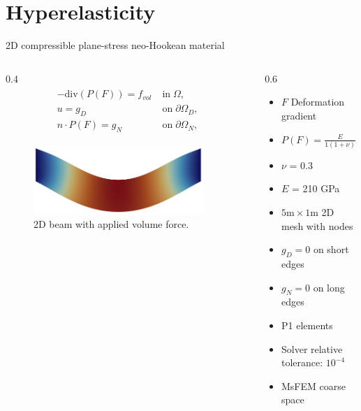 \section{Hyperelasticity}
\begin{frame}{2D compressible plane-stress neo-Hookean material}
	\vspace{0mm}
	\begin{columns}
		\begin{column}{0.4\textwidth}%
			\begin{align*}
				\label{eq:nonlinelas}
				\begin{split}
					-\mathrm{div}(P(F)) = f_{vol}\; & \mathrm{in}\;\Omega,           \\
					u = g_D \;                      & \mathrm{on}\;\partial\Omega_D, \\
					n\cdot P(F) = g_N\;             & \mathrm{on}\;\partial\Omega_N,
				\end{split}
			\end{align*}
			\begin{figure}
				\centering
				\includegraphics[width=0.9\textwidth]{images/beam2D.png}
				\caption{2D beam with applied volume force.}
				\label{fig:beam2d}
			\end{figure}
		\end{column}%
		\begin{column}{0.6\textwidth}
			\vspace{-1em}
			\centering
			\begin{itemize}
				\item $F$ Deformation gradient
				\item $P(F) = \frac{E}{1(1+\nu)}(F-F^{-T}) + \frac{E\nu}{(1+\nu)(1-2\nu)}\mathrm{ln}(\mathrm{det}(F)F^{-T})$
				\item $\nu$ = 0.3
				\item $E$ = 210 GPa
				\item $5\textrm{m}\times 1\textrm{m}$ 2D mesh with  nodes
        \item $g_D = 0$ on short edges
				\item $g_N = 0$ on long edges
				\item P1 elements
        \item Solver relative tolerance: $10^{-4}$
        \item MsFEM coarse space \footnotemark{}
			\end{itemize}
		\end{column}
	\end{columns}
\end{frame}

